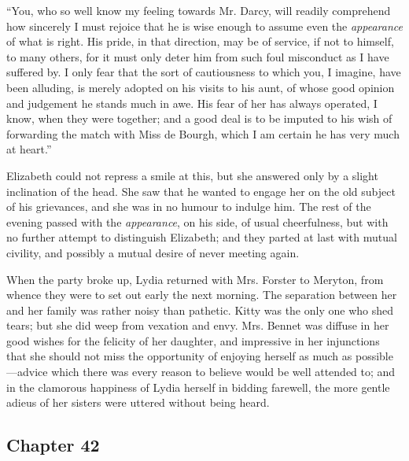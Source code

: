 “You, who so well know my feeling towards Mr. Darcy, will readily comprehend how sincerely I must rejoice that he is wise enough to assume even the {\em appearance} of what is right. His pride, in that direction, may be of service, if not to himself, to many others, for it must only deter him from such foul misconduct as I have suffered by. I only fear that the sort of cautiousness to which you, I imagine, have been alluding, is merely adopted on his visits to his aunt, of whose good opinion and judgement he stands much in awe. His fear of her has always operated, I know, when they were together; and a good deal is to be imputed to his wish of forwarding the match with Miss de Bourgh, which I am certain he has very much at heart.”

Elizabeth could not repress a smile at this, but she answered only by a slight inclination of the head. She saw that he wanted to engage her on the old subject of his grievances, and she was in no humour to indulge him. The rest of the evening passed with the {\em appearance}, on his side, of usual cheerfulness, but with no further attempt to distinguish Elizabeth; and they parted at last with mutual civility, and possibly a mutual desire of never meeting again.

When the party broke up, Lydia returned with Mrs. Forster to Meryton, from whence they were to set out early the next morning. The separation between her and her family was rather noisy than pathetic. Kitty was the only one who shed tears; but she did weep from vexation and envy. Mrs. Bennet was diffuse in her good wishes for the felicity of her daughter, and impressive in her injunctions that she should not miss the opportunity of enjoying herself as much as possible---advice which there was every reason to believe would be well attended to; and in the clamorous happiness of Lydia herself in bidding farewell, the more gentle adieus of her sisters were uttered without being heard.

\subsection[chapter-42]{\useURL[url42][][][]\from[url42] Chapter 42}

